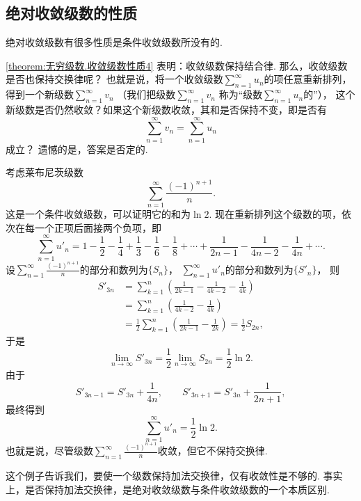 \subsection{绝对收敛级数的性质}
绝对收敛级数有很多性质是条件收敛级数所没有的.

\cref{theorem:无穷级数.收敛级数性质4} 表明：收敛级数保持结合律.
那么，收敛级数是否也保持交换律呢？
也就是说，将一个收敛级数\(\sum_{n=1}^\infty u_n\)的项任意重新排列，
得到一个新级数\(\sum_{n=1}^\infty v_n\)
（我们把级数\(\sum_{n=1}^\infty v_n\)
称为“级数\(\sum_{n=1}^\infty u_n\)的”），
这个新级数是否仍然收敛？如果这个新级数收敛，其和是否保持不变，即是否有\[
	\sum_{n=1}^\infty v_n = \sum_{n=1}^\infty u_n
\]成立？
遗憾的是，答案是否定的.

考虑莱布尼茨级数\[
	\sum_{n=1}^\infty \frac{(-1)^{n+1}}n.
\]
这是一个条件收敛级数，可以证明它的和为\(\ln2\).
现在重新排列这个级数的项，依次在每一个正项后面接两个负项，即\[
	\sum_{n=1}^\infty u'_n
	= 1 - \frac12 - \frac14
	+ \frac13 - \frac16 - \frac18
	+ \dotsb
	+ \frac1{2n-1} - \frac1{4n-2} - \frac1{4n}
	+ \dotsb.
\]
设\(\sum_{n=1}^\infty \frac{(-1)^{n+1}}n\)的部分和数列为\(\{S_n\}\)，
\(\sum_{n=1}^\infty u'_n\)的部分和数列为\(\{S'_n\}\)，
则\begin{align*}
	S'_{3n}
	&= \sum_{k=1}^n \left(
		\frac1{2k-1} - \frac1{4k-2} - \frac1{4k}
	\right) \\
	&= \sum_{k=1}^n \left(
		\frac1{4k-2} - \frac1{4k}
	\right) \\
	&= \frac12 \sum_{k=1}^n \left(
		\frac1{2k-1} - \frac1{2k}
	\right)
	= \frac12 S_{2n},
\end{align*}
于是\[
	\lim_{n\to\infty} S'_{3n}
	= \frac12 \lim_{n\to\infty} S_{2n}
	= \frac12 \ln 2.
\]
由于\[
	S'_{3n-1} = S'_{3n} + \frac1{4n},
	\qquad
	S'_{3n+1} = S'_{3n} + \frac1{2n+1},
\]
最终得到\[
	\sum_{n=1}^\infty u'_n
	= \frac12 \ln 2.
\]
也就是说，尽管级数\(\sum_{n=1}^\infty \frac{(-1)^{n+1}}n\)收敛，但它不保持交换律.

这个例子告诉我们，要使一个级数保持加法交换律，仅有收敛性是不够的.
事实上，是否保持加法交换律，是绝对收敛级数与条件收敛级数的一个本质区别.

